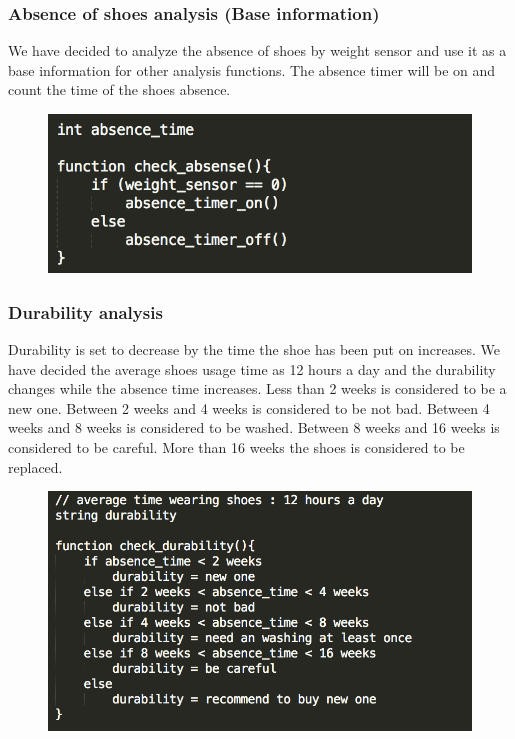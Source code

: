 \documentclass[conference]{IEEEtran}
\begin{document}
\subsubsection{Absence of shoes analysis (Base information)}
We have decided to analyze the absence of shoes by weight sensor and use it as a base information for other analysis functions. The absence timer will be on and count the time of the shoes absence.
\begin{figure}[h]
\begin{center}
    \includegraphics[scale=0.6]{analysis1}
    \label{fig:label}
\end{center}
\end{figure}
\subsubsection{Durability analysis}
Durability is set to decrease by the time the shoe has been put on increases. We have decided the average shoes usage time as 12 hours a day and the durability changes while the absence time increases. Less than 2 weeks is considered to be a new one. Between 2 weeks and 4 weeks is considered to be not bad. 
Between 4 weeks and 8 weeks is considered to be washed. Between 8 weeks and 16 weeks is considered to be careful. More than 16 weeks the shoes is considered to be replaced.
\begin{figure}[h]
\begin{center}
    \includegraphics[scale=0.58]{analysis2}
    \label{fig:label}
\end{center}
\end{figure}
\end{document}
